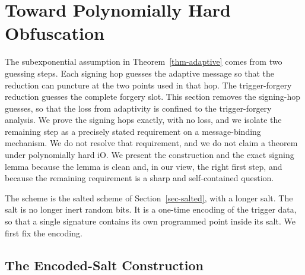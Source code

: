\section{Toward Polynomially Hard Obfuscation} \label{sec-poly}



The subexponential assumption in Theorem~\ref{thm-adaptive} comes from two guessing steps. Each signing hop guesses the adaptive message so that the reduction can puncture at the two points used in that hop. The trigger-forgery reduction guesses the complete forgery slot. This section removes the signing-hop guesses, so that the loss from adaptivity is confined to the trigger-forgery analysis. We prove the signing hops exactly, with no loss, and we isolate the remaining step as a precisely stated requirement on a message-binding mechanism. We do not resolve that requirement, and we do not claim a theorem under polynomially hard iO. We present the construction and the exact signing lemma because the lemma is clean and, in our view, the right first step, and because the remaining requirement is a sharp and self-contained question.

The scheme is the salted scheme of Section~\ref{sec-salted}, with a longer salt. The salt is no longer inert random bits. It is a one-time encoding of the trigger data, so that a single signature contains its own programmed point inside its salt. We first fix the encoding.

\subsection{The Encoded-Salt Construction} \label{sec-poly-constr}

